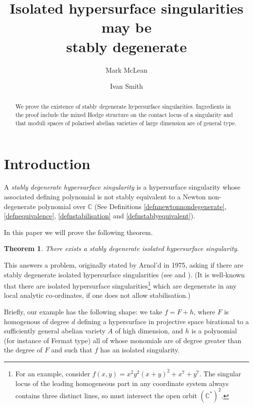 \documentclass[11pt]{amsart}
\title[A Stably Degenerate Singularity]{Isolated hypersurface singularities may be \\ stably degenerate}
\author{Mark McLean}
\author{Ivan Smith}
\newtheorem{theorem}{Theorem}[section]
\newcommand{\bC}{\mathbb{C}}
\numberwithin{equation}{section}
\begin{document}
\begin{abstract}
	We prove the existence of stably degenerate hypersurface singularities. Ingredients in the proof include the mixed Hodge structure on the contact locus of a singularity and that  moduli spaces of polarised abelian varieties of large dimension are of general type.
\end{abstract}

\maketitle
\begingroup
\setlength{\parskip}{0pt} %
{ \setcounter{tocdepth}{4}
	\setcounter{secnumdepth}{4}
	\hypersetup{linkcolor=black}
	\tableofcontents
}
\endgroup


\section{Introduction}


A \emph{stably degenerate hypersurface singularity} is a hypersurface singularity whose associated defining polynomial is not stably equivalent to a Newton non-degenerate polynomial over $\bC$ (See Definitions \ref{defnnewtonnondegenerate}, \ref{defnequivalence}, \ref{defnstabilisation} and \ref{defnstablyequivalent}).


In this paper we will prove the following theorem.


\begin{theorem} \label{maintheorem}
	There exists a stably degenerate isolated hypersurface singularity.
\end{theorem}


This answers a problem, originally stated by Arnol'd in 1975, asking if there are stably degenerate isolated hypersurface singularities (see \cite[Problem 3]{Arnold1983} and \cite[Problems 1975-3, 1976-8]{Arnold2005}). (It is well-known that there are isolated hypersurface singularities\footnote{For an example, consider $f(x,y)=x^2y^2(x+y)^2+ x^7+y^7$.
	The singular locus of the leading homogeneous part in any coordinate system always contains three distinct lines, so must  intersect the open orbit $(\bC^*)^2$.} which are degenerate in any local analytic co-ordinates, if one does not allow stabilisation.)


Briefly, our example has the following shape: we take $f=F+h$, where $F$ is homogenous of degree $d$ defining a hypersurface in projective space birational to a sufficiently general abelian variety $A$ of high dimension, and $h$ is a polynomial (for instance of Fermat type) all of whose monomials are of degree greater than the degree of $F$ and such that $f$ has an isolated singularity.
\end{document}
